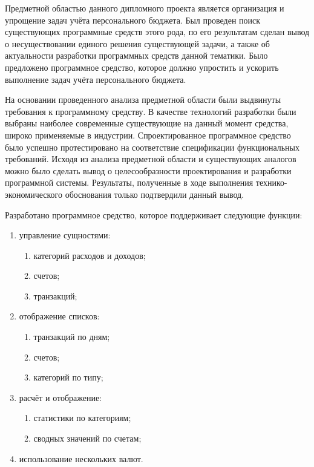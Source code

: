 
Предметной областью данного дипломного проекта является организация и упрощение задач учёта персонального бюджета.
Был проведен поиск существующих программные средств этого рода, по его результатам сделан вывод о несуществовании единого решения существующей задачи, а также об актуальности разработки программных средств данной тематики.
Было предложено программное средство, которое должно упростить и ускорить выполнение задач учёта персонального бюджета.

На основании проведенного анализа предметной области были выдвинуты требования к программному средству.
В качестве технологий разработки были выбраны наиболее современные существующие на данный момент средства, широко применяемые в индустрии.
Спроектированное программное средство было успешно протестировано на соответствие спецификации функциональных требований.
Исходя из анализа предметной области  и существующих аналогов можно было сделать вывод о целесообразности проектирования и разработки программной системы.
Результаты, полученные в ходе выполнения технико-экономического обоснования только подтвердили данный вывод.

Разработано программное средство, которое поддерживает следующие функции:
\begin{enumerate}
    \item управление сущностями:
    \begin{enumerate}
        \item категорий расходов и доходов;
        \item счетов;
        \item транзакций;
    \end{enumerate}
    \item отображение списков:
    \begin{enumerate}
        \item транзакций по дням;
        \item счетов;
        \item категорий по типу;
    \end{enumerate}
    \item расчёт и отображение:
    \begin{enumerate}
        \item статистики по категориям;
        \item сводных значений по счетам;
    \end{enumerate}
    \item использование нескольких валют.
\end{enumerate}


